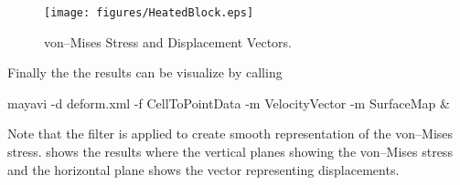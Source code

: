 \begin{figure}
\centerline{\texttt{[image: figures/HeatedBlock.eps]}}
\caption{von--Mises Stress and Displacement Vectors.}
\label{HEATEDBLOCK FIG 2}
\end{figure}

Finally the the results can be visualize by calling
\begin{python}
mayavi -d deform.xml -f CellToPointData -m VelocityVector -m SurfaceMap &
\end{python}
Note that the filter  is applied to create smooth representation of the 
von--Mises stress.  shows the results where the vertical planes showing the 
von--Mises stress and the horizontal plane shows the vector representing displacements.


